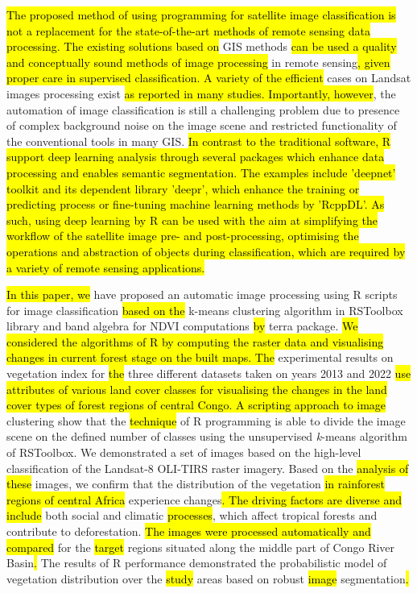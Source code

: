 \documentclass[applsci,article,submit,pdftex,moreauthors]{Definitions/mdpi}
\begin{document}
\hl{The proposed method of using programming for satellite image classification is not a replacement for the state-of-the-art methods of remote sensing data processing. The existing solutions based on } GIS methods \hl{can be used a quality and conceptually sound methods of image processing} in remote sensing\hl{, given proper care in supervised classification. A variety of the efficient }cases on Landsat images processing exist \hl{as reported in many studies. Importantly, however}, the automation of image classification is still a challenging problem due to presence of complex background noise on the image scene and restricted functionality of the conventional tools in many GIS. \hl{In contrast to the traditional software, R support deep learning analysis through several packages which enhance data processing and enables semantic segmentation. The examples include 'deepnet' toolkit and its dependent library 'deepr', which enhance the training or predicting process or fine-tuning machine learning methods by 'RcppDL'. As such, using deep learning by R can be used with the aim at simplifying the workflow of the satellite image pre- and post-processing, optimising the operations and abstraction of objects during classification, which are required by a variety of remote sensing applications.}

\hl{In this paper, we} have proposed an automatic image processing using R scripts for image classification \hl{based on the} k-means clustering algorithm in RSToolbox library and band algebra for NDVI computations \hl{by} terra package. \hl{We considered the algorithms of R by computing the raster data and visualising changes in current forest stage on the built maps. The }experimental results on vegetation index for \hl{the} three different datasets taken on years 2013 and 2022 \hl{use attributes of various land cover classes for visualising the changes in the land cover types of forest regions of central Congo. A scripting approach to image} clustering show that the \hl{technique} of R programming is able to divide the image scene on the defined number of classes using the\hl{ } unsupervised \emph{k}-means\hl{ }algorithm of RSToolbox. We demonstrated a set of images based on the high-level classification of the Landsat-8 OLI-TIRS raster imagery. Based on the\hl{ analysis of these} images, we\hl{ }confirm that the distribution of the\hl{ }vegetation\hl{ in rainforest regions of central Africa }experience changes\hl{. The driving factors are diverse and include }both social and climatic \hl{processes}, which affect\hl{ }tropical forests and contribute to\hl{ }deforestation. \hl{The images were processed automatically and compared }for the \hl{target} regions situated along the middle part of Congo River Basin\hl{. }The results of\hl{ }R performance demonstrated the probabilistic model of vegetation distribution over the\hl{ study }areas based on\hl{ }robust\hl{ image} segmentation\hl{.} 
\end{document}
